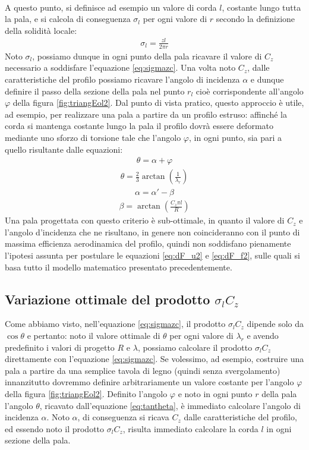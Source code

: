 \\
A questo punto, si definisce ad esempio un valore di corda $l$, costante lungo  tutta la pala, e si calcola di conseguenza $\sigma_l$ per ogni valore di $r$ secondo la definizione della solidità locale:
\begin{align*}
\sigma_l = \frac{z l}{2 \pi r}
\end{align*}
Noto $\sigma_l$, possiamo dunque in ogni punto della pala ricavare il valore di $C_z$ necessario a soddisfare l'equazione \ref{eq:sigmazc}. Una volta noto $C_z$, dalle caratteristiche del profilo possiamo ricavare l'angolo di incidenza $\alpha$ e dunque definire il passo della sezione della pala nel punto $r_l$ cioè corrispondente all'angolo $\varphi$ della figura \ref{fig:triangEol2}. Dal punto di vista pratico, questo approccio è utile, ad esempio, per realizzare una pala a partire da un profilo estruso: affinché la corda si mantenga costante lungo la pala il profilo dovrà essere deformato mediante uno sforzo di torsione tale che l'angolo $\varphi$, in ogni punto, sia pari a quello risultante dalle equazioni:
\begin{align*}
\theta = \alpha + \varphi
\end{align*}
\begin{align*}
\theta = \frac{2}{3} \arctan \left( \frac{1}{\lambda_r} \right)
\end{align*}
\begin{align*}
\alpha = \alpha' - \beta
\end{align*}
\begin{align*}
\beta = \arctan \left( \frac{C_z \pi l}{R} \right)
\end{align*}
Una pala progettata con questo criterio è sub-ottimale, in quanto il valore di $C_z$ e l'angolo d'incidenza che ne risultano, in genere non coincideranno con il punto di massima efficienza aerodinamica del profilo, quindi non soddisfano pienamente l'ipotesi assunta per postulare le equazioni \ref{eq:dF_u2} e \ref{eq:dF_f2}, sulle quali si basa tutto il modello matematico presentato precedentemente.

\subsection{Variazione ottimale del prodotto $\sigma_l C_z$}
Come abbiamo visto, nell'equazione \ref{eq:sigmazc}, il prodotto $\sigma_l C_z$ dipende solo da $\cos \theta$ e pertanto: noto il valore ottimale di $\theta$ per ogni valore di $\lambda_r$ e avendo predefinito i valori di progetto $R$ e $\lambda$, possiamo calcolare il prodotto $\sigma_l C_z$ direttamente con l'equazione \ref{eq:sigmazc}. Se volessimo, ad esempio, costruire una pala a partire da una semplice tavola di legno (quindi senza svergolamento) innanzitutto dovremmo definire arbitrariamente un valore costante per l'angolo $\varphi$ della figura \ref{fig:triangEol2}. Definito l'angolo $\varphi$ e noto in ogni punto $r$ della pala l'angolo $\theta$, ricavato dall'equazione \ref{eq:tantheta}, è immediato calcolare l'angolo di incidenza $\alpha$. Noto $\alpha$, di conseguenza si ricava $C_z$ dalle caratteristiche del profilo, ed essendo noto il prodotto $\sigma_l C_z$, risulta immediato calcolare la corda $l$ in ogni sezione della pala.

